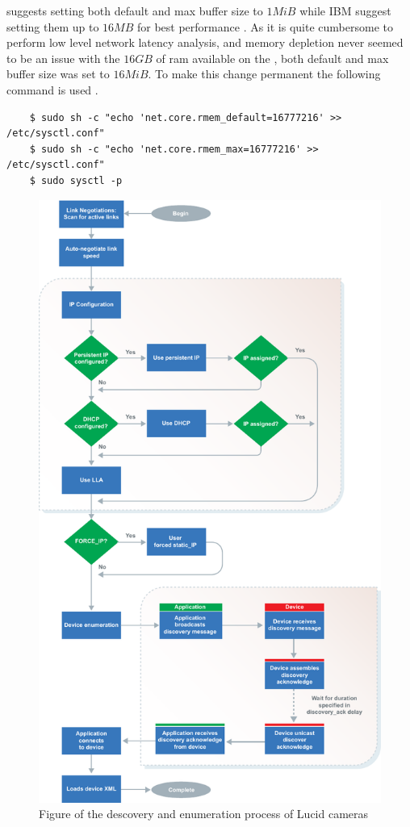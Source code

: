 \lucid suggests setting both default and max buffer size to $1MiB$ while IBM suggest setting them up to $16MB$ for best performance \cite{lucidvisionlabsReceiveBuffers2020}\cite{ibmIBMDocumentationTCPIP2021}.
As it is quite cumbersome to perform low level network latency analysis, and memory depletion never seemed to be an issue with the $16GB$ of \gls{ram} available on the \jx, both default and max buffer size was set to $16MiB$.
To make this change permanent the following command is used \cite{redhat10ChangingNetwork}.
\begin{verbatim}
    $ sudo sh -c "echo 'net.core.rmem_default=16777216' >> /etc/sysctl.conf"
    $ sudo sh -c "echo 'net.core.rmem_max=16777216' >> /etc/sysctl.conf"
    $ sudo sysctl -p
\end{verbatim}

\begin{figure}
    \centering
    \includegraphics[height=\textheight]{figures/PDF/lucid_ip_discovery.pdf}
    \caption{Figure of the descovery and enumeration process of Lucid cameras \cite{lucidvisionlabsTritonMPPolarized2020}}
    \label{fig:lucid_ip_discovery}
\end{figure}